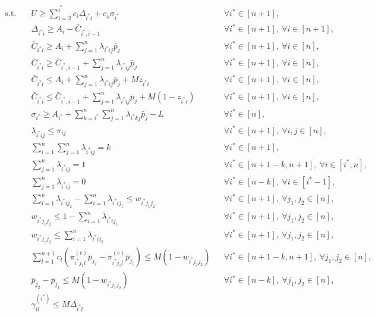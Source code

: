 \documentclass{article}
\begin{document}
\begin{align*}
\text{s.t.}\quad
& U \ge \sum_{i=2}^{i^*} c_i \Delta_{i^* i} + c_o \sigma_{i^*}
&& \forall i^* \in [n+1], \\
& \Delta_{i^* i} \ge A_i - \bar C_{i^*,i-1}
&& \forall i^* \in [n+1],\ \forall i \in [n+1], \\
& \bar C_{i^* i} \ge A_i + \sum_{j=1}^{n} \lambda_{i^* i j}\bar p_j
&& \forall i^* \in [n+1],\ \forall i \in [n], \\
& \bar C_{i^* i} \ge \bar C_{i^*,i-1} + \sum_{j=1}^{n} \lambda_{i^* i j}\bar p_j
&& \forall i^* \in [n+1],\ \forall i \in [n], \\
& \bar C_{i^* i} \le A_i + \sum_{j=1}^{n} \lambda_{i^* i j}\bar p_j + M z_{i^* i}
&& \forall i^* \in [n+1],\ \forall i \in [n], \\
& \bar C_{i^* i} \le \bar C_{i^*,i-1} + \sum_{j=1}^{n} \lambda_{i^* i j}\bar p_j + M(1-z_{i^* i})
&& \forall i^* \in [n+1],\ \forall i \in [n], \\
& \sigma_{i^*} \ge A_{i^*} + \sum_{k=i^*}^{n} \sum_{j=1}^{n} \lambda_{i^* k j}\bar p_j - L
&& \forall i^* \in [n], \\
& \lambda_{i^* i j} \le \pi_{ij}
&& \forall i^* \in [n+1],\ \forall i,j \in [n], \\
& \sum_{i=1}^{n} \sum_{j=1}^{n} \lambda_{i^* i j} = k
&& \forall i^* \in [n+1], \\
& \sum_{j=1}^{n} \lambda_{i^* i j} = 1
&& \forall i^* \in [n+1-k,n+1],\ \forall i \in [i^*,n], \\
& \sum_{j=1}^{n} \lambda_{i^* i j} = 0
&& \forall i^* \in [n-k],\ \forall i \in [i^*-1], \\
& \sum_{i=1}^{n} \lambda_{i^* i j_2} - \sum_{i=1}^{n} \lambda_{i^* i j_1} \le w_{i^* j_1 j_2}
&& \forall i^* \in [n+1],\ \forall j_1,j_2 \in [n], \\
& w_{i^* j_1 j_2} \le 1-\sum_{i=1}^{n} \lambda_{i^* i j_1}
&& \forall i^* \in [n+1],\ \forall j_1,j_2 \in [n], \\
& w_{i^* j_1 j_2} \le \sum_{i=1}^{n} \lambda_{i^* i j_2}
&& \forall i^* \in [n+1],\ \forall j_1,j_2 \in [n], \\
& \sum_{l=1}^{n+1} c_l \left(\pi^{(c)}_{i^* j_2 l}\bar p_{j_2} - \pi^{(c)}_{i^* j_1 l}\bar p_{j_1}\right)
\le M(1-w_{i^* j_1 j_2})
&& \forall i^* \in [n+1-k,n+1],\ \forall j_1,j_2 \in [n], \\
& \bar p_{j_2} - \bar p_{j_1} \le M(1-w_{i^* j_1 j_2})
&& \forall i^* \in [n-k],\ \forall j_1,j_2 \in [n], \\
& \gamma_{i l}^{(i^*)} \le M \Delta_{i^* l}

\end{align*}
\end{document}
